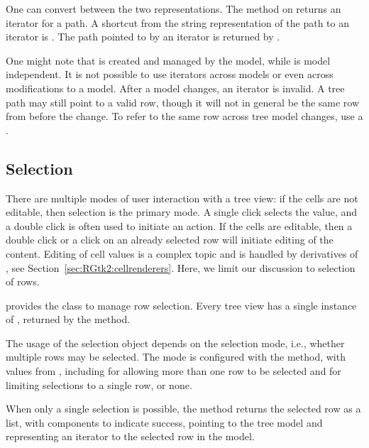 One can convert between the two representations. The method
 on  returns an
iterator for a path. A shortcut from the string representation of the
path to an iterator is . The
path pointed to by an iterator is returned by
.

One might note that  is created and managed by the
model, while  is model independent. It is not
possible to use iterators across models or even across modifications
to a model. After a model changes, an iterator is invalid. A tree path
may still point to a valid row, though it will not in general be the
same row from before the change. To refer to the same row across tree
model changes, use a .

\subsection{Selection}

There are multiple modes of user interaction with a tree view: if the
cells are not editable, then selection is the primary mode.  A single
click selects the value, and a double click is often used to initiate
an action. If the cells are editable, then a double click or a click
on an already selected row will initiate editing of the
content. Editing of cell values is a complex topic and is handled by
derivatives of , see
Section~\ref{sec:RGtk2:cellrenderers}. Here, we limit our discussion
to selection of rows.

\GTK\/ provides the class  to manage row
selection. Every tree view has a single instance of
, returned by the
 method.

The usage of the selection object depends on the selection mode, i.e.,
whether multiple rows may be selected. The mode is configured with the
 method, with values from
, including  for allowing more
than one row to be selected and  for limiting selections
to a single row, or none.

When only a single selection is possible, the method
 returns the selected row as a
list, with components  to indicate success, 
pointing to the tree model and  representing an iterator to
the selected row in the model.


